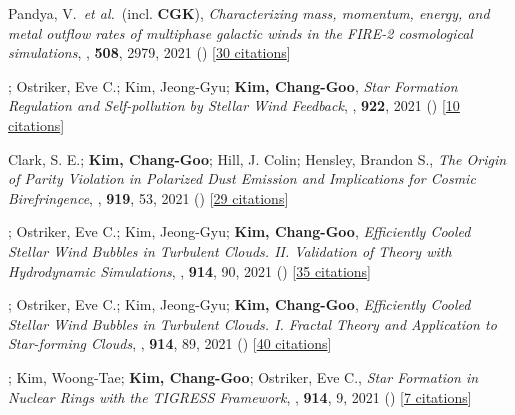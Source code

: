 \item[{36.}]Pandya, V.~\textit{et al.}~(incl. \textbf{CGK}), \textit{Characterizing mass, momentum, energy, and metal outflow rates of multiphase galactic winds in the FIRE-2 cosmological simulations}, , \textbf{508}, 2979, 2021 () [\href{http://adsabs.harvard.edu/abs/2021MNRAS.508.2979P}{30 citations}]

\item[{35.}]; Ostriker, Eve C.; Kim, Jeong-Gyu; \textbf{Kim, Chang-Goo}, \textit{Star Formation Regulation and Self-pollution by Stellar Wind Feedback}, , \textbf{922}, 2021 () [\href{http://adsabs.harvard.edu/abs/2021ApJ...922L...3L}{10 citations}]

\item[{34.}]Clark, S. E.; \textbf{Kim, Chang-Goo}; Hill, J. Colin; Hensley, Brandon S., \textit{The Origin of Parity Violation in Polarized Dust Emission and Implications for Cosmic Birefringence}, , \textbf{919}, 53, 2021 () [\href{http://adsabs.harvard.edu/abs/2021ApJ...919...53C}{29 citations}]

\item[{33.}]; Ostriker, Eve C.; Kim, Jeong-Gyu; \textbf{Kim, Chang-Goo}, \textit{Efficiently Cooled Stellar Wind Bubbles in Turbulent Clouds. II. Validation of Theory with Hydrodynamic Simulations}, , \textbf{914}, 90, 2021 () [\href{http://adsabs.harvard.edu/abs/2021ApJ...914...90L}{35 citations}]

\item[{32.}]; Ostriker, Eve C.; Kim, Jeong-Gyu; \textbf{Kim, Chang-Goo}, \textit{Efficiently Cooled Stellar Wind Bubbles in Turbulent Clouds. I. Fractal Theory and Application to Star-forming Clouds}, , \textbf{914}, 89, 2021 () [\href{http://adsabs.harvard.edu/abs/2021ApJ...914...89L}{40 citations}]

\item[{31.}]; Kim, Woong-Tae; \textbf{Kim, Chang-Goo}; Ostriker, Eve C., \textit{Star Formation in Nuclear Rings with the TIGRESS Framework}, , \textbf{914}, 9, 2021 () [\href{http://adsabs.harvard.edu/abs/2021ApJ...914....9M}{7 citations}]

